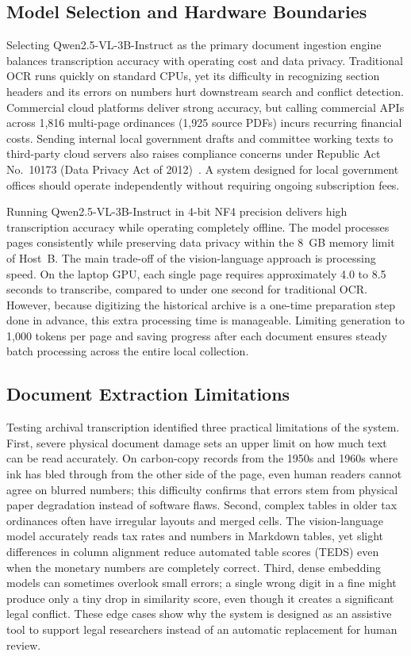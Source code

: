 \subsection{Model Selection and Hardware Boundaries}
Selecting Qwen2.5-VL-3B-Instruct as the primary document ingestion engine balances transcription accuracy with operating cost and data privacy. Traditional OCR runs quickly on standard CPUs, yet its difficulty in recognizing section headers and its errors on numbers hurt downstream search and conflict detection. Commercial cloud platforms deliver strong accuracy, but calling commercial APIs across 1,816 multi-page ordinances (1,925 source PDFs) incurs recurring financial costs. Sending internal local government drafts and committee working texts to third-party cloud servers also raises compliance concerns under Republic Act No.~10173 (Data Privacy Act of 2012)~\cite{philgov2012ra10173}. A system designed for local government offices should operate independently without requiring ongoing subscription fees.

Running Qwen2.5-VL-3B-Instruct in 4-bit NF4 precision delivers high transcription accuracy while operating completely offline. The model processes pages consistently while preserving data privacy within the 8~GB memory limit of Host~B. The main trade-off of the vision-language approach is processing speed. On the laptop GPU, each single page requires approximately 4.0 to 8.5 seconds to transcribe, compared to under one second for traditional OCR. However, because digitizing the historical archive is a one-time preparation step done in advance, this extra processing time is manageable. Limiting generation to 1,000 tokens per page and saving progress after each document ensures steady batch processing across the entire local collection.


\subsection{Document Extraction Limitations}
Testing archival transcription identified three practical limitations of the system. First, severe physical document damage sets an upper limit on how much text can be read accurately. On carbon-copy records from the 1950s and 1960s where ink has bled through from the other side of the page, even human readers cannot agree on blurred numbers; this difficulty confirms that errors stem from physical paper degradation instead of software flaws. Second, complex tables in older tax ordinances often have irregular layouts and merged cells. The vision-language model accurately reads tax rates and numbers in Markdown tables, yet slight differences in column alignment reduce automated table scores (TEDS) even when the monetary numbers are completely correct. Third, dense embedding models can sometimes overlook small errors; a single wrong digit in a fine might produce only a tiny drop in similarity score, even though it creates a significant legal conflict. These edge cases show why the system is designed as an assistive tool to support legal researchers instead of an automatic replacement for human review.


